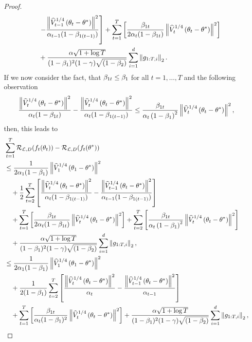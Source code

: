 \begin{proof}
\begin{align*}
&\quad \left. - \frac{\left\| \widehat{V}_{t-1}^{1/4}\left(\theta_{t} - \theta^{\ast}\right)\right\|^2}{\alpha_{t-1}(1-\beta_{1(t-1)})}\right] + \sum_{t=1}^T \left[\frac{\beta_{1t}}{2\alpha_t (1-\beta_{1t})} \left\| \widehat{V}_t^{1/4}\left(\theta_t -\theta^{\ast} \right) \right\|^2 \right]\\
&\quad + \frac{\alpha\sqrt{1 +\log T}}{(1-\beta_1)^2(1-\operatorname{\gamma})\sqrt{(1-\beta_2)}} \sum_{i=1}^{d} \left\|g_{1:T,i} \right\|_2.
\end{align*}
If we now consider the fact, that $\beta_{1t}\leq \beta_1$ for all $t=1,\ldots,T$ and the following observation
\begin{align*}
\frac{\left\| \widehat{V}_t^{1/4}\left( \theta_t - \theta^{\ast}\right)\right\|^2}{\alpha_t(1-\beta_{1t})} - \frac{\left\| \widehat{V}_t^{1/4}\left( \theta_t - \theta^{\ast}\right)\right\|^2}{\alpha_t(1-\beta_{1(t-1)})} \leq \frac{\beta_{1t}}{\alpha_t\left( 1-\beta_1 \right)^2} \left\| \widehat{V}_t^{1/4} \left( \theta_t - \theta^{\ast} \right) \right\|^2,
\end{align*}
then, this leads to
\begin{align*}
&\sum_{t=1}^T \risk_{\loss, D}(f_t(\t_t)) - \risk_{\loss, D}(f_t(\t^{\ast}))\\
&\leq \frac{1}{2\a_1(1-\b_{1})}\left\| \hat{V}_1^{1/4} \left( \t_1 - \t^{\ast} \right) \right\|^2\\
&\quad + \frac{1}{2}\sum_{t=2}^T \left[ \frac{\left\| \hat{V}_t^{1/4}\left( \t_t - \t^{\ast}\right)\right\|^2}{\a_t(1-\b_{1(t-1)})}
- \frac{\left\| \hat{V}_{t-1}^{1/4}\left(\t_{t} - \t^{\ast}\right)\right\|^2}{\a_{t-1}(1-\b_{1(t-1)})}\right]\\
&\quad + \sum_{t=1}^T \left[\frac{\b_{1t}}{2\a_t (1-\b_{1t})} \left\| \hat{V}_t^{1/4}\left(\t_t -\t^{\ast} \right) \right\|^2 \right] + \sum_{t=2}^T \left[\frac{\b_{1t}}{\a_t\left( 1-\b_1 \right)^2} \left\| \hat{V}_t^{1/4} \left( \t_t - \t^{\ast} \right) \right\|^2 \right]\\
&\quad + \frac{\a\sqrt{1 +\log T}}{(1-\b_1)^2(1-\g)\sqrt{(1-\b_2)}} \sum_{i=1}^{d} \left\|g_{1:T,i} \right\|_2,\\
&\leq \frac{1}{2\a_1(1-\b_{1})}\left\| \hat{V}_1^{1/4} \left( \t_1 - \t^{\ast} \right) \right\|^2\\
&\quad + \frac{1}{2(1-\b_{1})}\sum_{t=2}^T \left[ \frac{\left\| \hat{V}_t^{1/4}\left( \t_t - \t^{\ast}\right)\right\|^2}{\a_t}
- \frac{\left\| \hat{V}_{t-1}^{1/4}\left(\t_{t} - \t^{\ast}\right)\right\|^2}{\a_{t-1}}\right]\\
&\quad + \sum_{t=1}^T \left[\frac{\b_{1t}}{\a_t (1-\b_{1})^2} \left\| \hat{V}_t^{1/4}\left(\t_t -\t^{\ast} \right) \right\|^2 \right]
+ \frac{\a\sqrt{1 +\log T}}{(1-\b_1)^2(1-\g)\sqrt{(1-\b_2)}} \sum_{i=1}^{d} \left\|g_{1:T,i} \right\|_2,\\

\end{align*}
\end{proof}
